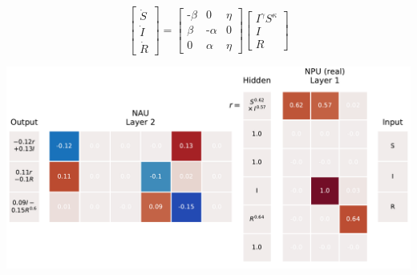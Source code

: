 \documentclass[30pt]{tikzposter}
\begin{document}
\begin{columns}
{    \begin{center}
      \begin{minipage}{.14\textwidth}
        \begin{equation*}
          \begin{bmatrix}
            \dot S \\ \dot I \\ \dot R
          \end{bmatrix}
          =
          \begin{bmatrix}
            \text{-}\beta & 0 & \eta \\
            \beta & \text{-}\alpha & 0 \\
            0 & \alpha & \eta
          \end{bmatrix}
          \begin{bmatrix}
            I^\gamma S^\kappa \\ I \\ R
          \end{bmatrix}
        \end{equation*}
      \end{minipage}
      \hspace{2cm}
      \begin{minipage}{.25\textwidth}
        \includegraphics[width=\textwidth]{../plots/sir_gatednpu_modelps.pdf}
      \end{minipage}
    \end{center}
    \vspace{0.5cm}
  }


\end{columns}
\end{document}
